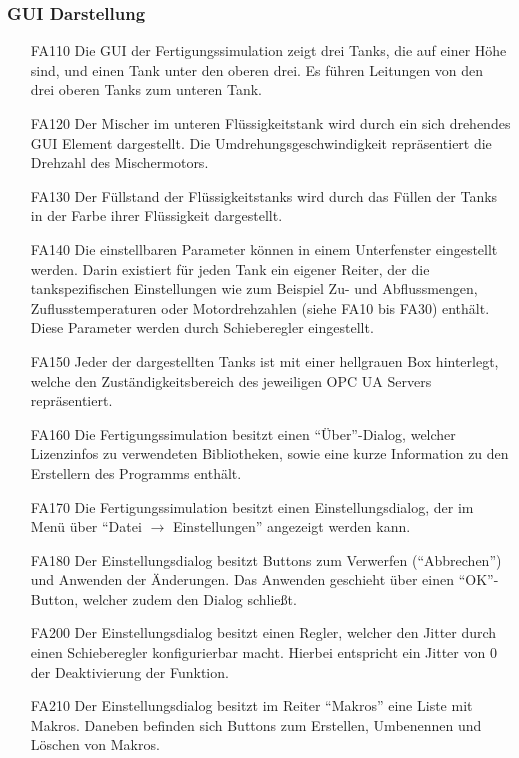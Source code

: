 \documentclass[parskip=full]{scrartcl}
\begin{document}
\subsubsection{GUI Darstellung}
\begin{enumerate}
\item[FA110] Die GUI der Fertigungssimulation zeigt drei Tanks, die auf einer Höhe sind, und einen Tank unter den oberen drei.
Es führen Leitungen von den drei oberen Tanks zum unteren Tank.
\item[FA120] Der Mischer im unteren Flüssigkeitstank wird durch ein sich drehendes GUI Element dargestellt.
Die Umdrehungsgeschwindigkeit repräsentiert die Drehzahl des Mischermotors.
\item[FA130] Der Füllstand der Flüssigkeitstanks wird durch das Füllen der Tanks in der Farbe ihrer Flüssigkeit dargestellt.
\item[FA140] Die einstellbaren Parameter können in einem Unterfenster eingestellt werden. Darin existiert für jeden Tank ein eigener Reiter, der die 
tankspezifischen Einstellungen wie zum Beispiel Zu- und Abflussmengen, Zuflusstemperaturen oder Motordrehzahlen (siehe FA10 bis FA30) enthält.
Diese Parameter werden durch Schieberegler eingestellt.
\item[FA150] Jeder der dargestellten Tanks ist mit einer hellgrauen Box hinterlegt, welche den Zuständigkeitsbereich des jeweiligen OPC UA Servers repräsentiert.
\item[FA160] Die Fertigungssimulation besitzt einen ``Über''-Dialog, welcher Lizenzinfos zu verwendeten Bibliotheken,
  sowie eine kurze Information zu den Erstellern des Programms enthält.
\item[FA170] Die Fertigungssimulation besitzt einen Einstellungsdialog, der im Menü über ``Datei $\rightarrow$ Einstellungen'' angezeigt werden kann.
\item[FA180] Der Einstellungsdialog besitzt Buttons zum Verwerfen (``Abbrechen'') und Anwenden der Änderungen. Das Anwenden geschieht über einen ``OK''-Button, welcher zudem den Dialog schließt.
\item[FA200] Der Einstellungsdialog besitzt einen Regler, welcher den \gls{Jitter} durch einen Schieberegler konfigurierbar macht.
  Hierbei entspricht ein \gls{Jitter} von 0 der Deaktivierung der Funktion.
\item[FA210] Der Einstellungsdialog besitzt im Reiter ``Makros'' eine Liste mit \glspl{Makro}. Daneben befinden sich Buttons zum Erstellen, Umbenennen und Löschen von \glspl{Makro}.
\end{enumerate}
\end{document}

